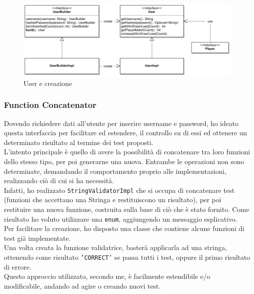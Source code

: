 \documentclass[a4paper,12pt]{report}
\begin{document}
\begin{figure}[ht]
    \begin{center}
        \centering
        \includegraphics[width=\textwidth]{img/Manuel/shadow/User.png}
    \end{center}
    \caption{User e creazione}
    \label{img:User}
\end{figure}
%

\subsubsection*{Function Concatenator}

Dovendo richiedere dati all'utente per inserire username e password, ho ideato questa interfaccia per facilitare ed estendere, il controllo su di essi ed ottenere un determinato risultato al termine dei test proposti.
\\
L'intento principale è quello di avere la possibilità di concatenare tra loro funzioni dello stesso tipo, per poi generarne una nuova. Entrambe le operazioni non sono determinate, demandando il comportamento proprio alle implementazioni, realizzando ciò di cui si ha necessità.
\\
Infatti, ho realizzato \texttt{StringValidatorImpl} che si occupa di concatenare test (funzioni che accettano una Stringa e restituiscono un risultato), per poi restituire una nuova funzione, costruita sulla base di ciò che è stato fornito. Come risultato ho voluto utilizzare una \texttt{enum}, aggiungendo un messaggio esplicativo.
\\
Per facilitare la creazione, ho disposto una classe che contiene alcune funzioni di test già implementate.
\\
Una volta creata la funzione validatrice, basterà applicarla ad una stringa, ottenendo come risultato \texttt{'CORRECT'} se passa tutti i test, oppure il primo risultato di errore.
\\
Questo approccio utilizzato, secondo me, è facilmente estendibile e/o modificabile, andando ad agire o creando nuovi test.
\end{document}
